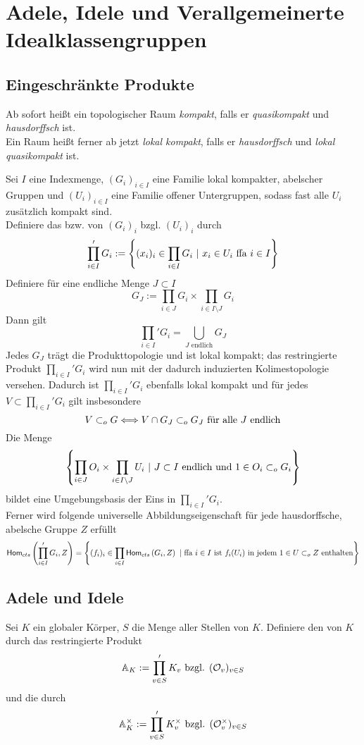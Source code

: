 \chapter{Adele, Idele und Verallgemeinerte Idealklassengruppen}
\section{Eingeschränkte Produkte}
\Bem{}
Ab sofort heißt ein topologischer Raum \textit{kompakt}, falls er \textit{quasikompakt} und \textit{hausdorffsch} ist.\\
Ein Raum heißt ferner ab jetzt \textit{lokal kompakt}, falls er \textit{hausdorffsch} und \textit{lokal quasikompakt} ist.

Sei $I$ eine Indexmenge, $(G_i)_{i\in I}$ eine Familie lokal kompakter, abelscher Gruppen und $(U_i)_{i\in I}$ eine Familie offener Untergruppen, sodass fast alle $U_i$ zusätzlich kompakt sind.\\
Definiere das  bzw.  von $(G_i)_i$ bzgl. $(U_i)_i$ durch
\[ \prod_{i\in I}'G_i := \set{(x_i)_i \in \prod_{i\in I}G_i}{ x_i \in U_i \text{ ffa } i \in I } \]
Definiere für eine endliche Menge $J \subset I$
\[ G_J := \prod_{i \in J}G_i \times \prod_{i \in I\setminus J} G_i \]
Dann gilt
\[ \prod_{i\in I}'G_i = \bigcup_{J \text{ endlich}}G_J  \]
Jedes $G_J$ trägt die Produkttopologie und ist lokal kompakt; das restringierte Produkt $\prod_{i\in I}'G_i$ wird nun mit der dadurch induzierten Kolimestopologie versehen. Dadurch ist $\prod_{i\in I}'G_i$ ebenfalls lokal kompakt und für jedes $V \subset \prod_{i\in I}'G_i$ gilt insbesondere
\[ V \subset_o G \overset{}{\Longleftrightarrow} V\cap G_J \subset_o G_J \text{ für alle }J \text{ endlich} \]
Die Menge
\[ \set{ \prod_{i \in J}O_i \times \prod_{i \in I\setminus J}U_i }{J \subset I \text{ endlich und } 1 \in O_i \subset_o G_i} \]
bildet eine Umgebungsbasis der Eins in $\prod_{i\in I}'G_i$.\\
Ferner wird folgende universelle Abbildungseigenschaft für jede hausdorffsche, abelsche Gruppe $Z$ erfüllt
\[ \Hom{cts}{\prod_{i\in I}'G_i}{Z} = \set{(f_i)_i \in \prod_{i \in I} \Hom{cts}{G_i}{Z} }{ \text{ffa } i \in I \text{ ist } f_i(U_i) \text{ in jedem }1 \in U\subset_o Z \text{ enthalten} } \]


\section{Adele und Idele}
Sei $K$ ein globaler Körper, $S$ die Menge aller Stellen von $K$. Definiere den  von $K$ durch das restringierte Produkt
\[ \mathbb{A}_K := \prod'_{v\in S} K_v \text{ bzgl. } (\mathcal{O}_v)_{v\in S} \]
und die  durch
\[ \mathbb{A}_K^\times := \prod'_{v\in S}K_v^\times \text{ bzgl. } (\mathcal{O}_v^\times)_{v\in S} \]

